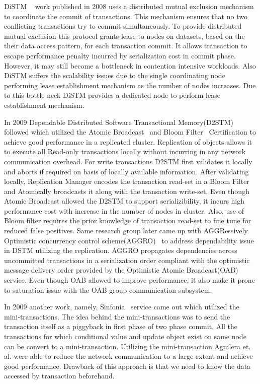 \documentclass[12pt,english]{report}
\begin{document}
DiSTM ~\cite{Kotselidis08distm:a} work published in 2008 uses a distributed mutual exclusion mechanism to coordinate the commit of transactions. This mechanism ensures that no two conflicting transactions try to commit simultaneously. To provide distributed mutual exclusion this protocol grants lease to nodes on datasets, based on the their data access pattern, for each transaction commit. It allows transaction to escape performance penalty incurred by serialization cost in commit phase. However, it may still become a bottleneck in contention intensive workloads. Also DiSTM suffers the scalability issues due to the single coordinating node performing lease establishment mechanism as the number of nodes increases. Due to this bottle neck DiSTM provides a dedicated node to perform lease establishment mechanism.

In 2009 Dependable Distributed Software Transactional Memory(D2STM)~\cite{D2STM:5368778} followed which utilized the Atomic Broadcast~\cite{Defago:2004:TOB:1041680.1041682} and Bloom Filter~\cite{Bloom:1970:STH:362686.362692} Certification to achieve good performance in a replicated cluster. Replication of objects allows it to execute all Read-only transactions locally without incurring in any network communication overhead. For write transactions D2STM first validates it locally and aborts if required on basis of locally available information. After validating locally, Replication Manager encodes the transaction read-set in a Bloom Filter and Atomically broadcasts it along with the transaction write-set. Even though Atomic Broadcast allowed the D2STM to support serializibility, it incurs high performance cost with increase in the number of nodes in cluster. Also, use of Bloom filter requires the prior knowledge of transaction read-set to fine tune for reduced false positives. Same research group later came up with AGGRessively Optimistic concurrency control scheme(AGGRO)~\cite{AGGRO:5598236} to address dependability issue in DSTM utilizing the replication. AGGRO propagates dependencies across uncommitted transactions in a serialization order compliant with the optimistic message delivery order provided by the Optimistic Atomic Broadcast(OAB)~\cite{OAB:Pedone200379} service. Even though OAB allowed to improve performance, it also make it prone to saturation issue with the OAB group communication subsystem.  

In 2009 another work, namely, Sinfonia~\cite{Aguilera:2009:SNP:1629087.1629088} service came out which utilized the mini-transactions. The idea behind the mini-transactions was to send the transaction itself as a piggyback in first phase of two phase commit. All the transactions for which conditional value and update object exist on same node can be convert to a mini-transaction. Utilizing the mini-transaction Aguilera et. al. were able to reduce the network communication to a large extent and achieve good performance. Drawback of this approach is that we need to know the data accessed by transaction beforehand.
\end{document}
